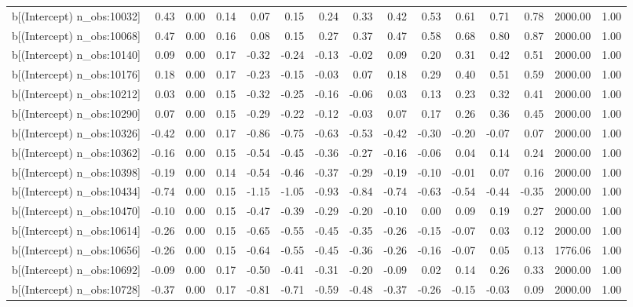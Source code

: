 \begin{table}[ht]
\begin{tabular}{rrrrrrrrrrrrrrr}
  b[(Intercept) n\_obs:10032] & 0.43 & 0.00 & 0.14 & 0.07 & 0.15 & 0.24 & 0.33 & 0.42 & 0.53 & 0.61 & 0.71 & 0.78 & 2000.00 & 1.00 \\ 
  b[(Intercept) n\_obs:10068] & 0.47 & 0.00 & 0.16 & 0.08 & 0.15 & 0.27 & 0.37 & 0.47 & 0.58 & 0.68 & 0.80 & 0.87 & 2000.00 & 1.00 \\ 
  b[(Intercept) n\_obs:10140] & 0.09 & 0.00 & 0.17 & -0.32 & -0.24 & -0.13 & -0.02 & 0.09 & 0.20 & 0.31 & 0.42 & 0.51 & 2000.00 & 1.00 \\ 
  b[(Intercept) n\_obs:10176] & 0.18 & 0.00 & 0.17 & -0.23 & -0.15 & -0.03 & 0.07 & 0.18 & 0.29 & 0.40 & 0.51 & 0.59 & 2000.00 & 1.00 \\ 
  b[(Intercept) n\_obs:10212] & 0.03 & 0.00 & 0.15 & -0.32 & -0.25 & -0.16 & -0.06 & 0.03 & 0.13 & 0.23 & 0.32 & 0.41 & 2000.00 & 1.00 \\ 
  b[(Intercept) n\_obs:10290] & 0.07 & 0.00 & 0.15 & -0.29 & -0.22 & -0.12 & -0.03 & 0.07 & 0.17 & 0.26 & 0.36 & 0.45 & 2000.00 & 1.00 \\ 
  b[(Intercept) n\_obs:10326] & -0.42 & 0.00 & 0.17 & -0.86 & -0.75 & -0.63 & -0.53 & -0.42 & -0.30 & -0.20 & -0.07 & 0.07 & 2000.00 & 1.00 \\ 
  b[(Intercept) n\_obs:10362] & -0.16 & 0.00 & 0.15 & -0.54 & -0.45 & -0.36 & -0.27 & -0.16 & -0.06 & 0.04 & 0.14 & 0.24 & 2000.00 & 1.00 \\ 
  b[(Intercept) n\_obs:10398] & -0.19 & 0.00 & 0.14 & -0.54 & -0.46 & -0.37 & -0.29 & -0.19 & -0.10 & -0.01 & 0.07 & 0.16 & 2000.00 & 1.00 \\ 
  b[(Intercept) n\_obs:10434] & -0.74 & 0.00 & 0.15 & -1.15 & -1.05 & -0.93 & -0.84 & -0.74 & -0.63 & -0.54 & -0.44 & -0.35 & 2000.00 & 1.00 \\ 
  b[(Intercept) n\_obs:10470] & -0.10 & 0.00 & 0.15 & -0.47 & -0.39 & -0.29 & -0.20 & -0.10 & 0.00 & 0.09 & 0.19 & 0.27 & 2000.00 & 1.00 \\ 
  b[(Intercept) n\_obs:10614] & -0.26 & 0.00 & 0.15 & -0.65 & -0.55 & -0.45 & -0.35 & -0.26 & -0.15 & -0.07 & 0.03 & 0.12 & 2000.00 & 1.00 \\ 
  b[(Intercept) n\_obs:10656] & -0.26 & 0.00 & 0.15 & -0.64 & -0.55 & -0.45 & -0.36 & -0.26 & -0.16 & -0.07 & 0.05 & 0.13 & 1776.06 & 1.00 \\ 
  b[(Intercept) n\_obs:10692] & -0.09 & 0.00 & 0.17 & -0.50 & -0.41 & -0.31 & -0.20 & -0.09 & 0.02 & 0.14 & 0.26 & 0.33 & 2000.00 & 1.00 \\ 
  b[(Intercept) n\_obs:10728] & -0.37 & 0.00 & 0.17 & -0.81 & -0.71 & -0.59 & -0.48 & -0.37 & -0.26 & -0.15 & -0.03 & 0.09 & 2000.00 & 1.00 \\ 

\end{tabular}
\end{table}

